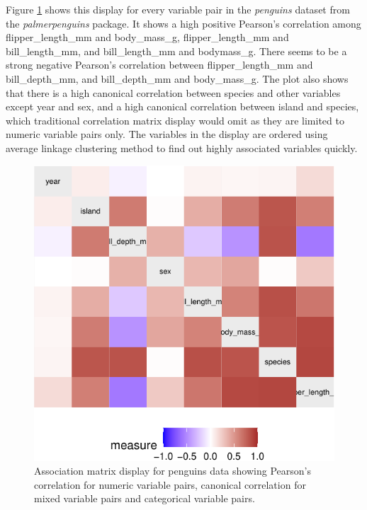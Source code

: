 Figure \ref{fig:assoc-heatmap} shows this display for every variable
pair in the \emph{penguins} dataset from the \emph{palmerpenguins}
package. It shows a high positive Pearson's correlation among
flipper\_length\_mm and body\_mass\_g, flipper\_length\_mm and
bill\_length\_mm, and bill\_length\_mm and bodymass\_g. There seems to
be a strong negative Pearson's correlation between flipper\_length\_mm
and bill\_depth\_mm, and bill\_depth\_mm and body\_mass\_g. The plot
also shows that there is a high canonical correlation between species
and other variables except year and sex, and a high canonical
correlation between island and species, which traditional correlation
matrix display would omit as they are limited to numeric variable pairs
only. The variables in the display are ordered using average linkage
clustering method to find out highly associated variables quickly.

\begin{Schunk}
\begin{figure}

{\centering \includegraphics{rj_paper_files/figure-latex/assoc-heatmap-1} 

}

\caption[Association matrix display for penguins data showing Pearson's correlation for numeric variable pairs, canonical correlation for mixed variable pairs and categorical variable pairs]{Association matrix display for penguins data showing Pearson's correlation for numeric variable pairs, canonical correlation for mixed variable pairs and categorical variable pairs.}\label{fig:assoc-heatmap}
\end{figure}
\end{Schunk}


